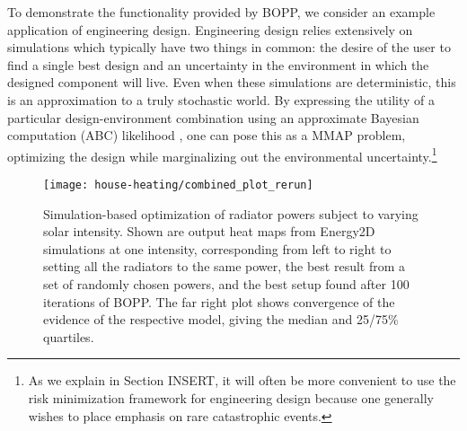 
To demonstrate the functionality provided by BOPP, we consider an example application of engineering design.  Engineering design relies extensively on simulations which typically have two things in common: the desire of the user to find a single best design and an uncertainty in the environment in which the designed component will live. Even when these simulations are deterministic, this is an approximation to a truly stochastic world. By expressing the utility of a particular design-environment combination using an approximate Bayesian computation (ABC) likelihood \citep{csillery2010approximate}, one can pose this as a MMAP problem, optimizing the design while marginalizing out the environmental uncertainty.\footnote{As we explain in Section INSERT, it will often be more
	convenient to use the risk minimization framework for engineering design because one generally wishes to place emphasis
	on rare catastrophic events.}

\begin{figure*}[t]
	\texttt{[image: house-heating/combined\_plot\_rerun]}
	\caption{
		\label{fig:houses}
		Simulation-based optimization of radiator powers subject to varying solar intensity. Shown are output heat maps from Energy2D \citep{xie2012energy2d} simulations at one intensity, corresponding from left to right to setting all the radiators to the same power, the best result from a set of randomly chosen powers, and the best setup found after 100 iterations of BOPP. The far right plot shows convergence of the evidence of the respective model, giving the median and 25/75\% quartiles.
	}
\end{figure*}

